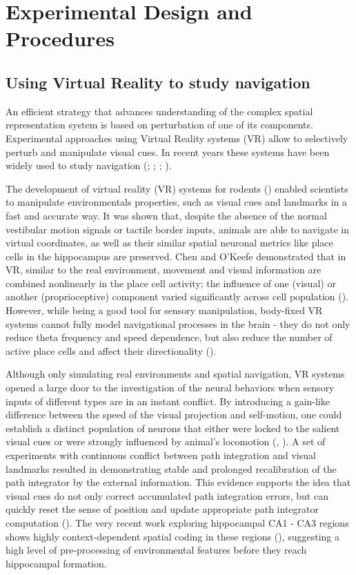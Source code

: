 \chapter{Experimental Design and Procedures}
\label{ch:design}

\section{Using Virtual Reality to study navigation}
\label{sec:using_vr_navigation}


An efficient strategy that advances understanding of the complex spatial representation system is based on perturbation of one of its components. Experimental approaches using Virtual Reality systems (VR) allow to selectively perturb and manipulate visual cues. In recent years these systems have been widely used to study navigation (\cite{Holscher2005}; \cite{RavassardA.2013}; \cite{Aronov2014}; \cite{Thurley2016}).

The development of virtual reality (VR) systems for rodents (\cite{Holscher2005}) enabled scientists to manipulate environmentals properties, such as visual cues and landmarks in a fast and accurate way. It was shown that, despite the absence of the normal vestibular motion signals or tactile border inputs, animals are able to navigate in virtual coordinates, as well as their similar spatial neuronal metrics like place cells in the hippocampus are preserved. Chen and O’Keefe demonstrated that in VR, similar to the real environment, movement and visual information are combined nonlinearly in the place cell activity; the influence of one (visual) or another (proprioceptive) component varied significantly across cell population (\cite{Chen2013}). However, while being a good tool for sensory manipulation, body-fixed VR systems cannot fully model navigational processes in the brain - they do not only reduce theta frequency and speed dependence, but also reduce the number of active place cells and affect their directionality (\cite{RavassardA.2013}).

Although only simulating real environments and spatial navigation, VR systems opened a large door to the investigation of the neural behaviors when sensory inputs of different types are in an instant conflict. By introducing a gain-like difference between the speed of the visual projection and self-motion, one could establish a distinct population of neurons that either were locked to the salient visual cues or were strongly influenced by animal’s locomotion (\cite{Jayakumar2018}, \cite{Haas2019}). A set of experiments with continuous conflict between path integration and visual landmarks resulted in demonstrating stable and prolonged recalibration of the path integrator by the external information. This evidence supports the idea that visual cues do not only correct accumulated path integration errors, but can quickly reset the sense of position and update appropriate path integrator computation (\cite{Jayakumar2018}). The very recent work exploring hippocampal CA1 - CA3 regions shows highly context-dependent spatial coding in these regions (\cite{Zhao2020}), suggesting a high level of pre-processing of environmental features before they reach hippocampal formation.

